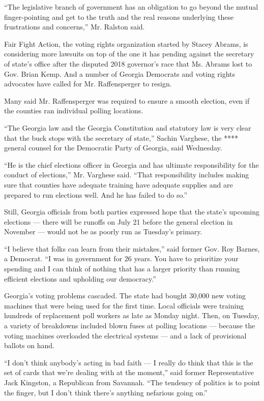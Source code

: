 ``The legislative branch of government has an obligation to go beyond
the mutual finger-pointing and get to the truth and the real reasons
underlying these frustrations and concerns,'' Mr. Ralston said.

Fair Fight Action, the voting rights organization started by Stacey
Abrams, is considering more lawsuits on top of the one it has pending
against the secretary of state's office after the disputed 2018
governor's race that Ms. Abrams lost to Gov. Brian Kemp. And a number of
Georgia Democrats and voting rights advocates have called for Mr.
Raffensperger to resign.

Many said Mr. Raffensperger was required to ensure a smooth election,
even if the counties ran individual polling locations.

``The Georgia law and the Georgia Constitution and statutory law is very
clear that the buck stops with the secretary of state,'' Sachin
Varghese, the **** general counsel for the Democratic Party of Georgia,
said Wednesday.

``He is the chief elections officer in Georgia and has ultimate
responsibility for the conduct of elections,'' Mr. Varghese said. ``That
responsibility includes making sure that counties have adequate training
have adequate supplies and are prepared to run elections well. And he
has failed to do so.''

Still, Georgia officials from both parties expressed hope that the
state's upcoming elections --- there will be runoffs on July 21 before
the general election in November --- would not be as poorly run as
Tuesday's primary.

``I believe that folks can learn from their mistakes,'' said former Gov.
Roy Barnes, a Democrat. ``I was in government for 26 years. You have to
prioritize your spending and I can think of nothing that has a larger
priority than running efficient elections and upholding our democracy.''

Georgia's voting problems cascaded. The state had bought 30,000 new
voting machines that were being used for the first time. Local officials
were training hundreds of replacement poll workers as late as Monday
night. Then, on Tuesday, a variety of breakdowns included blown fuses at
polling locations --- because the voting machines overloaded the
electrical systems --- and a lack of provisional ballots on hand.

``I don't think anybody's acting in bad faith --- I really do think that
this is the set of cards that we're dealing with at the moment,'' said
former Representative Jack Kingston, a Republican from Savannah. ``The
tendency of politics is to point the finger, but I don't think there's
anything nefarious going on.''


